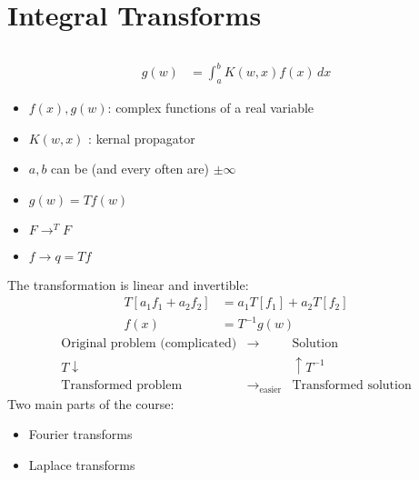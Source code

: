 \documentclass[cplx.tex]{subfiles}
\begin{document}
\part{Integral Transforms}
\chapter{}
\begin{align}
    g(w) &= \int_a^b K(w,x)f(x)\,dx
\end{align}
\begin{itemize}
    \item $f(x),g(w)$: complex functions of a real variable
    \item $K(w,x)$ : kernal propagator
    \item $a,b$ can be (and every often are) $\pm \infty$
    \item $g(w) = Tf(w)$
    \item $F \to^T F$ 
    \item $f \to q = Tf$
\end{itemize}
The transformation is linear and invertible:
\begin{align}
    T[a_1f_1 + a_2f_2] &= a_1T[f_1] + a_2T[f_2] \\
    f(x) &= T^{-1}g(w) 
\end{align}
\begin{equation*}
    \begin{matrix} \text{Original problem (complicated)} & \to & \text{Solution} \\ T\downarrow & & \uparrow T^{-1} \\ \text{Transformed problem} & \to_{\text{easier}} & \text{Transformed solution} \end{matrix}
\end{equation*}
Two main parts of the course:
\begin{itemize}
    \item Fourier transforms
    \item Laplace transforms
\end{itemize}
\end{document}
